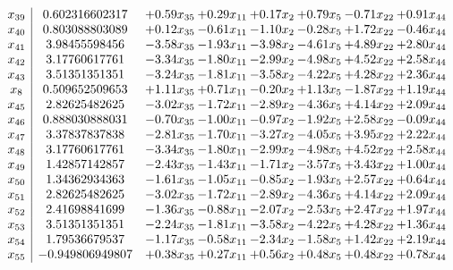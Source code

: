 \documentclass[8pt]{article}
\begin{document}
\[\begin{array}{c| c c@{\hskip 2pt} c@{\hskip 2pt} c@{\hskip 2pt} c@{\hskip 2pt} c@{\hskip 2pt} c@{\hskip 2pt} }
 x_{39}   &  0.602316602317 & +  0.59 x_{35} & +  0.29 x_{11} & +  0.17 x_{2} & +  0.79 x_{5} & -0.71 x_{22} & +  0.91 x_{44}\\
 x_{40}   &  0.803088803089 & +  0.12 x_{35} & -0.61 x_{11} & -1.10 x_{2} & -0.28 x_{5} & +  1.72 x_{22} & -0.46 x_{44}\\
 x_{41}   &  3.98455598456 & -3.58 x_{35} & -1.93 x_{11} & -3.98 x_{2} & -4.61 x_{5} & +  4.89 x_{22} & +  2.80 x_{44}\\
 x_{42}   &  3.17760617761 & -3.34 x_{35} & -1.80 x_{11} & -2.99 x_{2} & -4.98 x_{5} & +  4.52 x_{22} & +  2.58 x_{44}\\
 x_{43}   &  3.51351351351 & -3.24 x_{35} & -1.81 x_{11} & -3.58 x_{2} & -4.22 x_{5} & +  4.28 x_{22} & +  2.36 x_{44}\\
 x_{8}   &  0.509652509653 & +  1.11 x_{35} & +  0.71 x_{11} & -0.20 x_{2} & +  1.13 x_{5} & -1.87 x_{22} & +  1.19 x_{44}\\
 x_{45}   &  2.82625482625 & -3.02 x_{35} & -1.72 x_{11} & -2.89 x_{2} & -4.36 x_{5} & +  4.14 x_{22} & +  2.09 x_{44}\\
 x_{46}   &  0.888030888031 & -0.70 x_{35} & -1.00 x_{11} & -0.97 x_{2} & -1.92 x_{5} & +  2.58 x_{22} & -0.09 x_{44}\\
 x_{47}   &  3.37837837838 & -2.81 x_{35} & -1.70 x_{11} & -3.27 x_{2} & -4.05 x_{5} & +  3.95 x_{22} & +  2.22 x_{44}\\
 x_{48}   &  3.17760617761 & -3.34 x_{35} & -1.80 x_{11} & -2.99 x_{2} & -4.98 x_{5} & +  4.52 x_{22} & +  2.58 x_{44}\\
 x_{49}   &  1.42857142857 & -2.43 x_{35} & -1.43 x_{11} & -1.71 x_{2} & -3.57 x_{5} & +  3.43 x_{22} & +  1.00 x_{44}\\
 x_{50}   &  1.34362934363 & -1.61 x_{35} & -1.05 x_{11} & -0.85 x_{2} & -1.93 x_{5} & +  2.57 x_{22} & +  0.64 x_{44}\\
 x_{51}   &  2.82625482625 & -3.02 x_{35} & -1.72 x_{11} & -2.89 x_{2} & -4.36 x_{5} & +  4.14 x_{22} & +  2.09 x_{44}\\
 x_{52}   &  2.41698841699 & -1.36 x_{35} & -0.88 x_{11} & -2.07 x_{2} & -2.53 x_{5} & +  2.47 x_{22} & +  1.97 x_{44}\\
 x_{53}   &  3.51351351351 & -2.24 x_{35} & -1.81 x_{11} & -3.58 x_{2} & -4.22 x_{5} & +  4.28 x_{22} & +  1.36 x_{44}\\
 x_{54}   &  1.79536679537 & -1.17 x_{35} & -0.58 x_{11} & -2.34 x_{2} & -1.58 x_{5} & +  1.42 x_{22} & +  2.19 x_{44}\\
 x_{55}   &  -0.949806949807 & +  0.38 x_{35} & +  0.27 x_{11} & +  0.56 x_{2} & +  0.48 x_{5} & +  0.48 x_{22} & +  0.78 x_{44}\\

\end{array}\]
\end{document}
